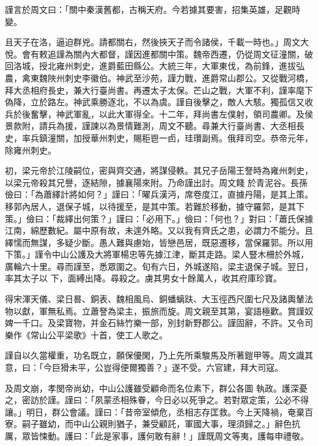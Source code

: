 \begin{pinyinscope}
 謹言於周文曰：「關中秦漢舊都，古稱天府。今若據其要害，招集英雄，足觀時變。



 且天子在洛，逼迫群兇。請都關右，然後挾天子而令諸侯，千載一時也。」周文大悅。會有敕追謹為關內大都督，謹因進都關中策。魏帝西遷，仍從周文征潼關，破回洛城，授北雍州刺史，進爵藍田縣公。大統三年，大軍東伐，為前鋒，進拔弘農，禽東魏陜州刺史李徽伯。神武至沙苑，謹力戰，進爵常山郡公。又從戰河橋，
 拜大丞相府長史，兼大行臺尚書。再遷太子太保。芒山之戰，大軍不利，謹率麾下偽降，立於路左。神武乘勝逐北，不以為虞。謹自後擊之，敵人大駭。獨孤信又收兵於後奮擊，神武軍亂，以此大軍得全。十二年，拜尚書左僕射，領司農卿。及侯景款附，請兵為援，謹諫以為景情難測，周文不聽。尋兼大行臺尚書、大丞相長史，率兵鎮潼關，加授華州刺史，賜秬鬯一卣，珪瓚副焉。俄拜司空。恭帝元年，除雍州刺史。



 初，梁元帝於江陵嗣位，密與齊交通，將謀侵軼。其兄子岳陽王詧時為雍州刺史，以梁元帝殺其兄譽，逐結隙，據襄陽來附。乃命謹出討。周文餞
 於青泥谷。長孫儉曰：「為蕭繹計將如何？」謹曰：「曜兵漢沔，席卷度江，直據丹陽，是其上策。移郭內居人，退保子城，以待援至，是其中策。若難於移動，據守羅郭，是其下策。」儉曰：「裁繹出何策？」謹曰：「必用下。」儉曰：「何也？」對曰：「蕭氏保據江南，綿歷數紀。屬中原有故，未遑外略。又以我有齊氏之患，必謂力不能分。且繹懦而無謀，多疑少斷。愚人難與慮始，皆戀邑居，既惡遷移，當保羅郭。所以用下策。」謹令中山公護及大將軍楊忠等先據江津，斷其走路。梁人豎木柵於外城，廣輪六十里。尋而謹至，悉眾圍之。旬有六日，外城遂陷，梁主退保子城。翌日，率其太子以
 下，面縛出降。尋殺之。虜其男女十餘萬人，收其府庫珍寶。



 得宋渾天儀、梁日晷、銅表、魏相風烏、銅蟠螭趺、大玉徑西尺圍七尺及諸輿輦法物以獻，軍無私焉。立蕭詧為梁主，振旅而旋。周文親至其第，宴語極歡。賞謹奴婢一千口。及梁寶物，并金石絲竹樂一部，別封新野郡公。謹固辭，不許。又令司樂作《常山公平梁歌》十首，使工人歌之。



 謹自以久當權重，功名既立，願保優閑，乃上先所乘駿馬及所著鎧甲等。周文識其意，曰：「今巨猾未平，公豈得便爾獨善？」遂不受。六官建，拜大司寇。



 及周文崩，孝閔帝尚幼，中山公護雖受顧命而名位素下，群公各圖
 執政。護深憂之，密訪於謹。謹曰：「夙蒙丞相殊眷，今日必以死爭之。若對眾定策，公必不得讓。」明日，群公會議。謹曰：「昔帝室傾危，丞相志存匡救。今上天降禍，奄棄百寮。嗣子雖幼，而中山公親則猶子，兼受顧託，軍國大事，理須歸之。」辭色抗厲，眾皆悚動。護曰：「此是家事，護何敢有辭！」謹既周文等夷，護每申禮敬。




\end{pinyinscope}
